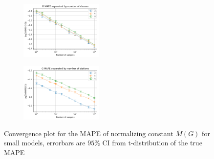 \begin{figure}[!htb]
\begin{center}
\begin{subfigure}
    \centering
    \includegraphics[width=0.45\textwidth]{Chap6_EvaluationAndAnalysis/images/ConvergenceNumberOfClasses_SM.png}
\end{subfigure}
\begin{subfigure}
    \centering
    \includegraphics[width=0.45\textwidth]{Chap6_EvaluationAndAnalysis/images/ConvergenceNumberOfStations_SM.png}
\end{subfigure}
\caption{Convergence plot for the MAPE of normalizing constant \(\bar{M}(G)\) for small models, errorbars are \(95\%\) CI from t-distribution of the true MAPE}
\label{fig:ClassSeparatedConvergence}
\end{center}
\end{figure}


